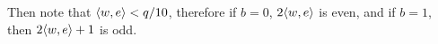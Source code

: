 \documentclass{article}
\begin{document}
\begin{enumerate}[,start=5]
\begin{itemize}
Then note that $\langle w,e \rangle < q/10$, therefore if $b = 0$, $2\langle w,e \rangle$ is even, and if $b = 1$,
then $2\langle w,e \rangle + 1$ is odd.%
\end{itemize}%
\end{enumerate}%
\end{document}
